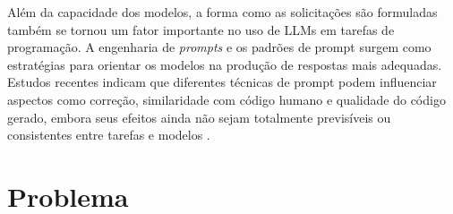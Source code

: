 Além da capacidade dos modelos, a forma como as solicitações são formuladas também se tornou um fator importante no uso de LLMs em tarefas de programação. A engenharia de \textit{prompts} e os padrões de prompt surgem como estratégias para orientar os modelos na produção de respostas mais adequadas. Estudos recentes indicam que diferentes técnicas de prompt podem influenciar aspectos como correção, similaridade com código humano e qualidade do código gerado, embora seus efeitos ainda não sejam totalmente previsíveis ou consistentes entre tarefas e modelos \cite{DellaPortaEtAll, KhojahEtAll}.

\section{Problema}




